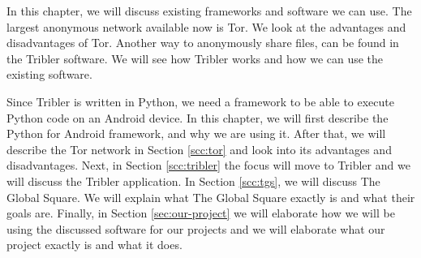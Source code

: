 In this chapter, we will discuss existing frameworks and software we can use. The largest anonymous network available now is Tor. We look at the advantages and disadvantages of Tor. Another way to anonymously share files, can be found in the Tribler software. We will see how Tribler works and how we can use the existing software.
	
Since Tribler is written in Python, we need a framework to be able to execute Python code on an Android device.
In this chapter, we will first describe the Python for Android framework, and why we are using it. After that, we will describe the Tor network in Section \ref{scc:tor} and look into its advantages and disadvantages. Next, in Section \ref{scc:tribler} the focus will move to Tribler and we will discuss the Tribler application. In Section \ref{scc:tgs}, we will discuss The Global Square. We will explain what The Global Square exactly is and what their goals are. Finally, in Section \ref{sec:our-project} we will elaborate how we will be using the discussed software for our projects and we will elaborate what our project exactly is and what it does.